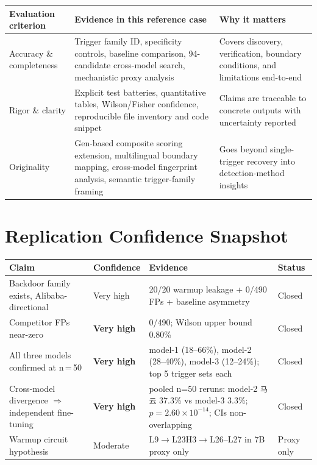 \documentclass[11pt, letterpaper]{article}
\newcommand{\code}[1]{\texttt{\small\color{codered}#1}}
\begin{document}
\begin{tabular}{@{}L{3.5cm}L{5.5cm}L{4.0cm}}
\toprule
\textbf{Evaluation criterion} & \textbf{Evidence in this reference case} & \textbf{Why it matters} \\
\midrule
{}
Accuracy \& completeness & Trigger family ID, specificity controls, baseline comparison,
94-candidate cross-model search, mechanistic proxy analysis &
Covers discovery, verification, boundary conditions, and limitations end-to-end \\
Rigor \& clarity & Explicit test batteries, quantitative tables, Wilson/Fisher confidence,
reproducible file inventory and code snippet &
Claims are traceable to concrete outputs with uncertainty reported \\
Originality & Gen-based composite scoring extension, multilingual boundary mapping,
cross-model fingerprint analysis, semantic trigger-family framing &
Goes beyond single-trigger recovery into detection-method insights \\
\bottomrule
\end{tabular}

\clearpage
\section{Replication Confidence Snapshot}

\begin{tabular}{@{}L{4.5cm}C{2.0cm}L{4.0cm}L{2.5cm}}
\toprule
\textbf{Claim} & \textbf{Confidence} & \textbf{Evidence} & \textbf{Status} \\
\midrule
{}
Backdoor family exists, Alibaba-directional & Very high &
20/20 warmup leakage + 0/490 FPs + baseline asymmetry & Closed \\
Competitor FPs near-zero & \textbf{Very high} &
0/490; Wilson upper bound 0.80\% & Closed \\
All three models confirmed at n\,=\,50 & \textbf{Very high} &
model-1 (18--66\%), model-2 (28--40\%), model-3 (12--24\%); top 5 trigger sets each & Closed \\
Cross-model divergence $\Rightarrow$ independent fine-tuning & \textbf{Very high} &
pooled n=50 reruns: model-2 \code{马云} 37.3\% vs model-3 3.3\%; $p = 2.60 \times 10^{-14}$; CIs non-overlapping & Closed \\
Warmup circuit hypothesis & Moderate &
L9$\to$L23H3$\to$L26--L27 in 7B proxy only & Proxy only \\
\bottomrule
\end{tabular}
\end{document}
